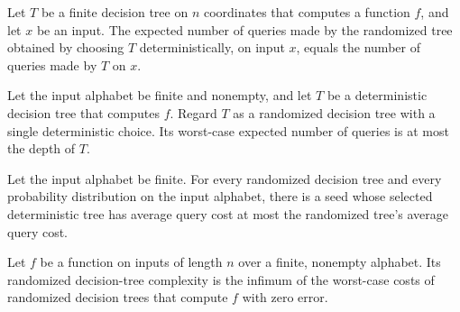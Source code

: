 \begin{theorem}
\label{FABL.RandomizedDecisionTree.inputCost_ofDeterministic}
\leanok
{}
Let $T$ be a finite decision tree on $n$ coordinates that computes a function $f$, and
let $x$ be an input. The expected number of queries made by the randomized tree obtained
by choosing $T$ deterministically, on input $x$, equals the number of queries made by
$T$ on $x$.
\end{theorem}

\begin{theorem}
\label{FABL.RandomizedDecisionTree.worstCaseCost_ofDeterministic_le_depth}
\leanok
{}
Let the input alphabet be finite and nonempty, and let $T$ be a deterministic decision
tree that computes $f$. Regard $T$ as a randomized decision tree with a single
deterministic choice. Its worst-case expected number of queries is at most the depth of
$T$.
\end{theorem}

\begin{theorem}
\label{FABL.RandomizedDecisionTree.exists_deterministic_averageCost_le}
\leanok
{}
Let the input alphabet be finite. For every randomized decision tree and every
probability distribution on the input alphabet, there is a seed whose selected
deterministic tree has average query cost at most the randomized tree’s average query
cost.
\end{theorem}

\begin{definition}
\label{FABL.RandomizedDecisionTree.complexity}
\leanok
{}
Let $f$ be a function on inputs of length $n$ over a finite, nonempty alphabet. Its
randomized decision-tree complexity is the infimum of the worst-case costs of randomized
decision trees that compute $f$ with zero error.
\end{definition}


